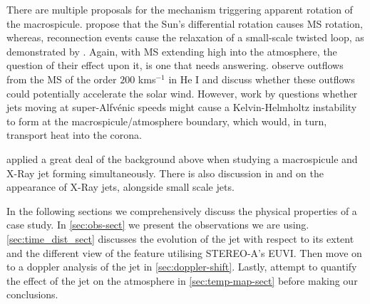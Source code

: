 There are multiple proposals for the mechanism triggering apparent rotation of the macrospicule. 
\cite{Curdt2011} propose that the Sun's differential rotation causes MS rotation, whereas, reconnection events cause the relaxation of a small-scale twisted loop, as demonstrated by \cite{Adams2014}.
Again, with MS extending high into the atmosphere, the question of their effect upon it, is one that needs answering.
\cite{Pike1997} observe outflows from the MS of the order $200$ kms$^{-1}$ in He I and discuss whether these outflows could potentially accelerate the solar wind.
However, work by \cite{Zaqarashvili2014} questions whether jets moving at super-Alfv{\'e}nic speeds might cause a Kelvin-Helmholtz instability to form at the macrospicule/atmosphere boundary, which would, in turn, transport heat into the corona.

\cite{Kamio2010} applied a great deal of the background above when studying a macrospicule and X-Ray jet forming simultaneously. 
There is also discussion in \cite{Pike1997} and \cite{Kim2007} on the appearance of X-Ray jets, alongside small scale jets.

In the following sections we comprehensively discuss the physical properties of a case study. In \cref{sec:obs-sect} we present the observations we are using. 
\ref{sec:time_dist_sect} discusses the evolution of the jet with respect to its extent and the different view of the feature utilising STEREO-A's EUVI. 
Then move on to a doppler analysis of the jet in \cref{sec:doppler-shift}.
Lastly, attempt to quantify the effect of the jet on the atmosphere in \cref{sec:temp-map-sect} before making our conclusions.

